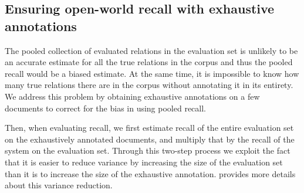 \subsection{Ensuring open-world recall with exhaustive annotations}

The pooled collection of evaluated relations in the evaluation set is unlikely to be an accurate estimate for all the true relations in the corpus and thus the pooled recall would be a biased estimate.
At the same time, it is impossible to know how many true relations there are in the corpus without annotating it in its entirety.
We address this problem by obtaining exhaustive annotations on a few documents to correct for the bias in using pooled recall.


Then, when evaluating recall, we first estimate recall of the entire evaluation set on the exhaustively annotated documents, and multiply that by the recall of the system on the evaluation set. Through this two-step process we exploit the fact that it is easier to reduce variance by increasing the size of the evaluation set than it is to increase the size of the exhaustive annotation.  provides more details about this variance reduction.

